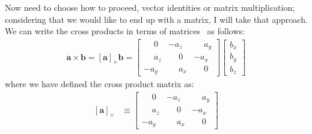 \documentclass[12pt]{article}
\begin{document}
Now need to choose how to proceed, vector identities or matrix multiplication; considering that we would like to end up with a matrix, I will take that approach. We can write the cross products in terms of matrices~\cite{Liu_2008_HadamardKhatriRao} as follows:
\begin{align}
\label{eqn:cross_product_matrix_vector}
\mathbf{a} \times \mathbf{b} = [\mathbf{a}]_{\times} \mathbf{b} = 
\begin{bmatrix}
\phantom{-}0   &           -a_z & \phantom{-}a_y \\ 
\phantom{-}a_z & \phantom{-}0   &           -a_x \\
          -a_y & \phantom{-}a_x & \phantom{-}0
\end{bmatrix}
\begin{bmatrix}
b_x \\
b_y \\
b_z
\end{bmatrix}
\end{align}
where we have defined the cross product matrix as:
\begin{align}
\label{eqn:cross_product_matrix_def}
[\mathbf{a}]_\times &\equiv 
\begin{bmatrix}
\phantom{-}0   &           -a_z & \phantom{-}a_y \\ 
\phantom{-}a_z & \phantom{-}0   &           -a_x \\
          -a_y & \phantom{-}a_x & \phantom{-}0
\end{bmatrix}
\end{align}
\end{document}
